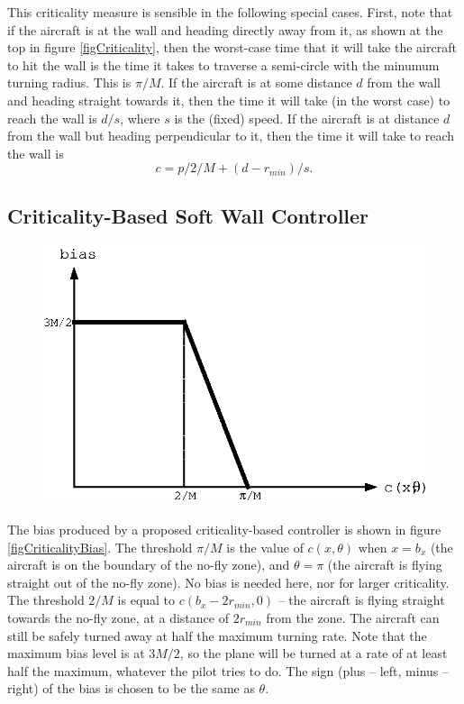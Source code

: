 \documentclass[11pt]{article}
\begin{document}
This criticality measure is sensible in the following special cases.
First, note that if the aircraft is at the wall and heading directly
away from it, as shown at the top in figure \ref{figCriticality}, then the
worst-case time that it will take the aircraft to hit the wall is the
time it takes to traverse a semi-circle with the minumum turning radius.
This is $\pi/M$.
If the aircraft is at some distance $d$ from the wall and heading
straight towards it, then the time it will take (in the worst case) to
reach the wall is $d/s$, where $s$ is the (fixed) speed.
If the aircraft is at distance $d$ from the wall but heading perpendicular
to it, then the time it will take to reach the wall is
\[
c = p/2/M+(d-r_{min})/s .
\]

\subsection{Criticality-Based Soft Wall Controller}

\begin{figure}[btp]
\centering
\includegraphics{criticalityBias.eps}
\end{figure}

The bias produced by a proposed criticality-based controller is shown in figure
\ref{figCriticalityBias}.
The threshold $\pi/M$ is the value of $c(x, \theta)$ when $x = b_{x}$ (the 
aircraft is on the boundary of the no-fly zone), and $\theta = \pi$ (the 
aircraft is flying straight out of the no-fly zone). No bias is needed here,
nor for larger criticality.
The threshold $2/M$ is equal to $c(b_{x}-2r_{min}, 0)$ -- the aircraft is flying
straight towards the no-fly zone, at a distance of $2r_{min}$ from the zone.
The aircraft can still be safely turned away at half the 
maximum turning rate. Note that the maximum
bias level is at $3M/2$, so the plane will
be turned at a rate of at least half the maximum, whatever the pilot tries to
do. The sign (plus -- left, minus -- right) of the bias is chosen to be the
same as $\theta$.
\end{document}
